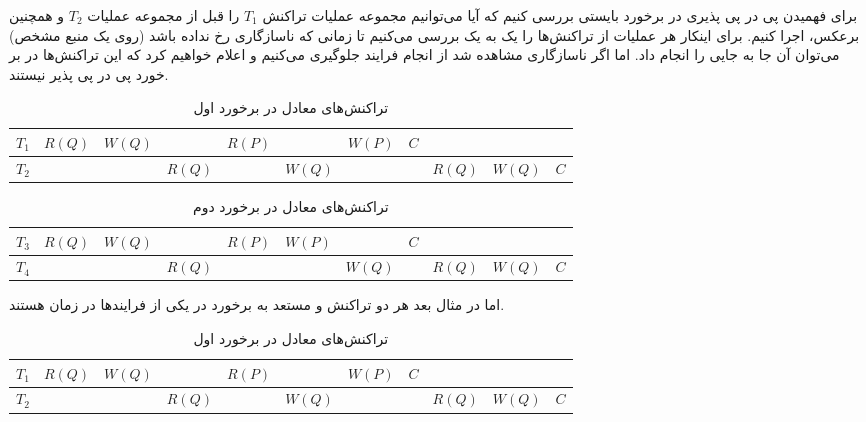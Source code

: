 برای فهمیدن پی در پی پذیری در برخورد بایستی بررسی کنیم که آیا می‌توانیم مجموعه
عملیات تراکنش $T_1$ را قبل از مجموعه عملیات $T_2$ و همچنین برعکس، اجرا کنیم.
برای اینکار هر عملیات از تراکنش‌ها را یک به یک بررسی می‌کنیم تا زمانی که
ناسازگاری رخ نداده باشد (روی یک منبع مشخص) می‌توان آن جا به جایی را انجام داد.
اما اگر ناسازگاری مشاهده شد از انجام فرایند جلوگیری می‌کنیم و اعلام خواهیم کرد
که این تراکنش‌ها در بر خورد پی در پی پذیر نیستند.

\begin{LTR}
    \begin{table}[h]
        \centering
        \begin{RTL}
            \caption{تراکنش‌های معادل در برخورد اول}
        \end{RTL}
        \begin{tabular}{|c|c|c|c|c|c|c|c|c|c|c|}
            \hline
            $T_{1}$ & $R(Q)$ & $W(Q)$ & & $R(P)$ & & $W(P)$ & $C$ & & & \\ \hline
            $T_{2}$ & & & $R(Q)$ & & $W(Q)$ & &  & $R(Q)$ & $W(Q)$ & $C$ \\ \hline
        \end{tabular}
    \end{table}
\end{LTR}

\begin{LTR}
    \begin{table}[h]
        \centering
        \begin{RTL}
            \caption{تراکنش‌های معادل در برخورد دوم}
        \end{RTL}
        \begin{tabular}{|c|c|c|c|c|c|c|c|c|c|c|}
            \hline
            $T_{3}$ & $R(Q)$ & $W(Q)$ & & $R(P)$ & $W(P)$ & & $C$ & & & \\ \hline
            $T_{4}$ & & & $R(Q)$ & & & $W(Q)$ &  & $R(Q)$ & $W(Q)$ & $C$ \\ \hline
        \end{tabular}
    \end{table}
\end{LTR}

\newpage

اما در مثال بعد هر دو تراکنش  و  مستعد به برخورد در یکی
از فرایند‌ها در زمان هستند.

\begin{LTR}
    \begin{table}[H]
        \centering
        \begin{RTL}
            \caption{تراکنش‌های معادل در برخورد اول}
        \end{RTL}
        \begin{tabular}{|c|c|c|c|c|c|c|c|c|c|c|}
            \hline
            $T_{1}$ & $R(Q)$ & $W(Q)$ & & $R(P)$ & & $W(P)$ & $C$ & & & \\ \hline
            $T_{2}$ & & & $R(Q)$ & & $W(Q)$ & &  & $R(Q)$ & $W(Q)$ & $C$ \\ \hline
        \end{tabular}
    \end{table}
\end{LTR}


